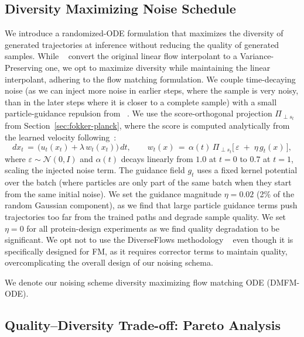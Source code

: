 \documentclass{article} %
\begin{document}
\subsection{Diversity Maximizing Noise Schedule}
\label{sec:custom-rand-ode}
We introduce a randomized-ODE formulation that maximizes the diversity of generated trajectories at inference without reducing the quality of generated samples. While ~\cite{kim2025flowits} convert the original linear flow interpolant to a Variance-Preserving one, we opt to maximize diversity while maintaining the linear interpolant, adhering to the flow matching formulation. We couple time-decaying noise (as we can inject more noise in earlier steps, where the sample is very noisy, than in the later steps where it is closer to a complete sample) with a small particle-guidance repulsion from ~\cite{corso2023particleguidancenoniiddiverse}. We use the score-orthogonal projection $\Pi_{\perp s_t}$ from Section~\ref{sec:fokker-planck}, where the score is computed analytically from the learned velocity following~\cite{kim2025flowits}:
\[
dx_t \,=\, \big(u_t(x_t) + \lambda\,w_t(x_t)\big)\,dt,\qquad
w_t(x) \,=\, \alpha(t)\,\Pi_{\perp s_t}\Big[\,\varepsilon\; +\; \eta\,g_t(x)\,\Big],
\]
where $\varepsilon\!\sim\!\mathcal{N}(0,I)$ and $\alpha(t)$ decays linearly from $1.0$ at $t{=}0$ to $0.7$ at $t{=}1$, scaling the injected noise term. The guidance field $g_t$ uses a fixed kernel potential over the batch (where particles are only part of the same batch when they start from the same initial noise). We set the guidance magnitude $\eta = 0.02$ (2\% of the random Gaussian component), as we find that large particle guidance terms push trajectories too far from the trained paths and degrade sample quality. We set $\eta = 0$ for all protein-design experiments as we find quality degradation to be significant. We opt not to use the DiverseFlows methodology ~\cite{morshed2025diverseflowsampleefficientdiversemode} even though it is specifically designed for FM, as it requires corrector terms to maintain quality, overcomplicating the overall design of our noising schema.

We denote our noising scheme diversity maximizing flow matching ODE (DMFM-ODE).

\subsection{Quality–Diversity Trade-off: Pareto Analysis}
\label{sec:noise_study}
\end{document}
